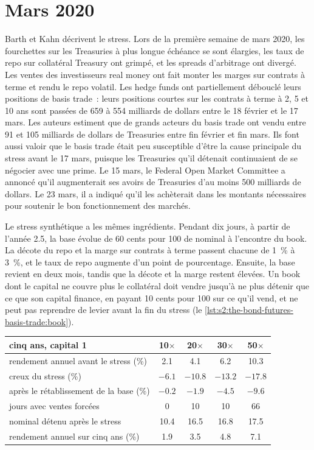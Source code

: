 \section{Mars 2020}

Barth et Kahn décrivent le stress. Lors de la première semaine de mars 2020, les fourchettes sur les Treasuries à plus longue échéance se sont élargies, les taux de repo sur collatéral Treasury ont grimpé,
et les spreads d'arbitrage ont divergé. Les ventes des investisseurs real money ont fait monter les marges sur contrats à terme et rendu le repo volatil. Les hedge funds ont partiellement débouclé leurs
positions de basis trade~: leurs positions courtes sur les contrats à terme à 2, 5 et 10 ans sont passées de 659 à 554 milliards de dollars entre le 18 février et le 17 mars. Les auteurs estiment
que de grands acteurs du basis trade ont vendu entre 91 et 105 milliards de dollars de Treasuries entre fin février et fin mars. Ils font aussi valoir que le
basis trade était peu susceptible d'être la cause principale du stress avant le 17 mars, puisque les Treasuries qu'il détenait continuaient de se négocier avec une prime. Le 15 mars, le
Federal Open Market Committee a annoncé qu'il augmenterait ses avoirs de Treasuries d'au moins 500 milliards de dollars. Le 23 mars, il a indiqué qu'il les achèterait dans les
montants nécessaires pour soutenir le bon fonctionnement des marchés.

Le stress synthétique a les mêmes ingrédients. Pendant dix jours, à partir de l'année 2.5, la base évolue de 60 cents pour 100 de nominal à l'encontre du book. La décote du repo
et la marge sur contrats à terme passent chacune de 1~\% à 3~\%, et le taux de repo augmente d'un point de pourcentage. Ensuite, la base revient en deux mois,
tandis que la décote et la marge restent élevées. Un book dont le capital ne couvre plus le collatéral doit vendre jusqu'à ne plus détenir que ce que son capital finance, en payant 10 cents
pour 100 sur ce qu'il vend, et ne peut pas reprendre de levier avant la fin du stress (le \cref{lst:s2:the-bond-futures-basis-trade:book}).

\begin{center}
\small
\begin{tabular}{@{}lcccc@{}}
\toprule
cinq ans, capital 1 & 10$\times$ & 20$\times$ & 30$\times$ & 50$\times$\\
\midrule
rendement annuel avant le stress (\%) & 2.1 & 4.1 & 6.2 & 10.3\\
creux du stress (\%) & $-6.1$ & $-10.8$ & $-13.2$ & $-17.8$\\
après le rétablissement de la base (\%) & $-0.2$ & $-1.9$ & $-4.5$ & $-9.6$\\
jours avec ventes forcées & 0 & 10 & 10 & 66\\
nominal détenu après le stress & 10.4 & 16.5 & 16.8 & 17.5\\
rendement annuel sur cinq ans (\%) & 1.9 & 3.5 & 4.8 & 7.1\\
\bottomrule
\end{tabular}
\end{center}

